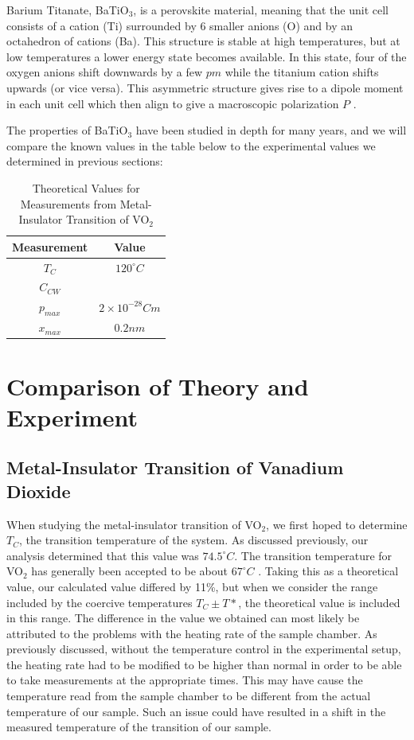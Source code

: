 \documentclass[%
 reprint,
 amsmath,amssymb,
 aps,
 pra,
]{revtex4-1}
\begin{document}
Barium Titanate, BaTiO$_3$, is a perovskite material, meaning that the unit cell consists of a cation (Ti) surrounded by 6 smaller anions (O) and by an octahedron of cations (Ba). This structure is stable at high temperatures, but at low temperatures a lower energy state becomes available. In this state, four of the oxygen anions shift downwards by a few $pm$ while the titanium cation shifts upwards (or vice versa). This asymmetric structure gives rise to a dipole moment in each unit cell which then align to give a macroscopic polarization $P$ \cite{manual}. 

The properties of BaTiO$_3$ have been studied in depth for many years, and we will compare the known values in the table below to the experimental values we determined in previous sections:

\begin{table}[htbp]
	\begin{center}
		\begin{tabular}{|c|c|}
			\hline \textbf{Measurement} & \textbf{Value} \\
			\hline $T_{C}$ & $120^{\circ} C$\\
			\hline $C_{CW}$ &  \\
			\hline $p_{max}$ & $2 \times 10^{-28}Cm$\\
			\hline $x_{max}$ & $0.2 nm$\\
			\hline
		\end{tabular}
	\end{center}
	\caption{Theoretical Values for Measurements from Metal-Insulator Transition of VO$_{2}$}
	\label{Tab:BaTiO3Theory}
\end{table}

\section{Comparison of Theory and Experiment}

\subsection{Metal-Insulator Transition of Vanadium Dioxide}
When studying the metal-insulator transition of VO$_{2}$, we first hoped to determine $T_C$, the transition temperature of the system. As discussed previously, our analysis determined that this value was $74.5^{\circ} C$. The transition temperature for VO$_{2}$ has generally been accepted to be about $67^{\circ} C$ \cite{VO2temp, VO2BandTheory}. Taking this as a theoretical value, our calculated value differed by 11\%, but when we consider the range included by the coercive temperatures $T_{C} \pm T*$, the theoretical value is included in this range. The difference in the value we obtained can most likely be attributed to the problems with the heating rate of the sample chamber. As previously discussed, without the temperature control in the experimental setup, the heating rate had to be modified to be higher than normal in order to be able to take measurements at the appropriate times. This may have cause the temperature read from the sample chamber to be different from the actual temperature of our sample. Such an issue could have resulted in a shift in the measured temperature of the transition of our sample.
\end{document}
